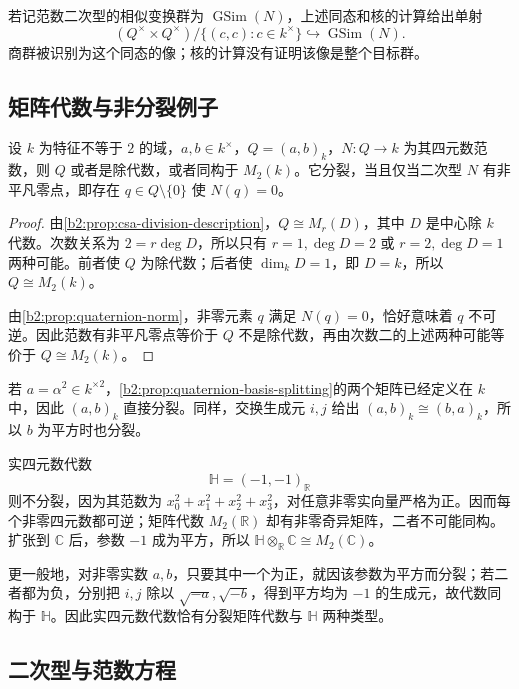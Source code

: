 若记范数二次型的相似变换群为 \(\operatorname{GSim}(N)\)，上述同态和核的计算给出单射
\[
	(Q^\times\times Q^\times)/\{(c,c):c\in k^\times\} \hookrightarrow\operatorname{GSim}(N).
\]
商群被识别为这个同态的像；核的计算没有证明该像是整个目标群。

\subsection{矩阵代数与非分裂例子}
\label{b2:subsec:1704:02}

\begin{proposition}\label{b2:prop:quaternion-division-or-split}
	设 \(k\) 为特征不等于 \(2\) 的域，\(a,b\in k^\times\)，\(Q=(a,b)_k\)，\(N:Q\rightarrow k\) 为其四元数范数，则 \(Q\) 或者是除代数，或者同构于 \(M_2(k)\)。它分裂，当且仅当二次型 \(N\) 有非平凡零点，即存在 \(q\in Q\setminus\{0\}\) 使 \(N(q)=0\)。
\end{proposition}
\begin{proof}
	由\cref{b2:prop:csa-division-description}，\(Q\cong M_r(D)\)，其中 \(D\) 是中心除 \(k\) 代数。次数关系为 \(2=r\deg D\)，所以只有 \(r=1,\deg D=2\) 或 \(r=2,\deg D=1\) 两种可能。前者使 \(Q\) 为除代数；后者使 \(\dim_kD=1\)，即 \(D=k\)，所以 \(Q\cong M_2(k)\)。

	由\cref{b2:prop:quaternion-norm}，非零元素 \(q\) 满足 \(N(q)=0\)，恰好意味着 \(q\) 不可逆。因此范数有非平凡零点等价于 \(Q\) 不是除代数，再由次数二的上述两种可能等价于 \(Q\cong M_2(k)\)。
\end{proof}

若 \(a=\alpha^2\in k^{\times2}\)，\cref{b2:prop:quaternion-basis-splitting}的两个矩阵已经定义在 \(k\) 中，因此 \((a,b)_k\) 直接分裂。同样，交换生成元 \(i,j\) 给出 \((a,b)_k\cong(b,a)_k\)，所以 \(b\) 为平方时也分裂。

\ProseParagraphBreak
实四元数代数
\[
	\mathbb H=(-1,-1)_{\mathbb R}
\]
则不分裂，因为其范数为 \(x_0^2+x_1^2+x_2^2+x_3^2\)，对任意非零实向量严格为正。因而每个非零四元数都可逆；矩阵代数 \(M_2(\mathbb R)\) 却有非零奇异矩阵，二者不可能同构。扩张到 \(\mathbb C\) 后，参数 \(-1\) 成为平方，所以 \(\mathbb H\otimes_{\mathbb R}\mathbb C\cong M_2(\mathbb C)\)。

\ProseParagraphBreak
更一般地，对非零实数 \(a,b\)，只要其中一个为正，就因该参数为平方而分裂；若二者都为负，分别把 \(i,j\) 除以 \(\sqrt{-a},\sqrt{-b}\)，得到平方均为 \(-1\) 的生成元，故代数同构于 \(\mathbb H\)。因此实四元数代数恰有分裂矩阵代数与 \(\mathbb H\) 两种类型。

\subsection{二次型与范数方程}
\label{b2:subsec:1704:03}

